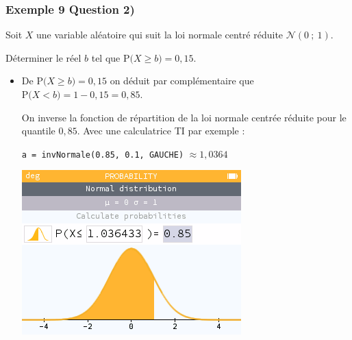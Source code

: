 \documentclass[xcolor=svgnames,t,final]{beamer}
\newcommand{\loinorm}[2]{\mathcal{N}\left(#1\ ; \ #2 \right)}
\newcommand{\proba}[1]{\text{P}\big(#1\big)}
\begin{document}
\begin{frame}
\frametitle{Exemple 9 Question 2)}

Soit $X$ une variable aléatoire qui suit la loi normale centré réduite $\loinorm{0}{1}$.

Déterminer le réel $b$ tel que  $\proba{X \geqslant b}=0,15$.
\begin{itemize}
\pause \item  De $\proba{X \geqslant b}=0,15$ on déduit par complémentaire que $\proba{X < b}=1-0,15=0,85$.

On inverse la fonction de répartition de la loi normale centrée réduite pour le quantile $0,85$. Avec une calculatrice TI par exemple : 

 \texttt{a = invNormale(0.85, 0.1, GAUCHE)} $\approx 1,0364$

\begin{center}
\includegraphics[scale=0.3]{images/exemple9-fig2.png}
\end{center}
\end{itemize}

\end{frame}
\end{document}
